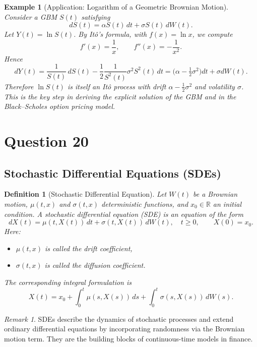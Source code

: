 \documentclass[12pt,a4paper]{book}
\newtheorem{definition}{Definition}[chapter]
\newtheorem{example}{Example}[chapter]
\theoremstyle{remark}
\newtheorem{remark}{Remark}[chapter]
\begin{document}
\begin{example}[Application: Logarithm of a Geometric Brownian Motion]
Consider a GBM $S(t)$ satisfying
\[
dS(t) = \alpha S(t)\,dt + \sigma S(t)\,dW(t).
\]
Let $Y(t) = \ln S(t)$. By Itô's formula, with $f(x) = \ln x$, we compute
\[
f'(x) = \frac{1}{x}, \qquad f''(x) = -\frac{1}{x^2}.
\]
Hence
\[
dY(t) = \frac{1}{S(t)}\,dS(t) - \frac{1}{2}\frac{1}{S^2(t)}\sigma^2 S^2(t)\,dt
= \Big(\alpha - \tfrac{1}{2}\sigma^2\Big)dt + \sigma dW(t).
\]
Therefore $\ln S(t)$ is itself an Itô process with drift $\alpha - \tfrac{1}{2}\sigma^2$ and volatility $\sigma$. This is the key step in deriving the explicit solution of the GBM and in the Black--Scholes option pricing model.
\end{example}










\newpage
\section{Question 20}
\subsection*{Stochastic Differential Equations (SDEs)}

\begin{definition}[Stochastic Differential Equation]
Let $W(t)$ be a Brownian motion, $\mu(t,x)$ and $\sigma(t,x)$ deterministic functions, and $x_0 \in \mathbb{R}$ an initial condition. 
A \emph{stochastic differential equation (SDE)} is an equation of the form
\[
dX(t) = \mu(t,X(t))\,dt + \sigma(t,X(t))\,dW(t), 
\quad t \geq 0, \qquad X(0) = x_0.
\]
Here:
\begin{itemize}
    \item $\mu(t,x)$ is called the \emph{drift coefficient},
    \item $\sigma(t,x)$ is called the \emph{diffusion coefficient}.
\end{itemize}
The corresponding \emph{integral formulation} is
\[
X(t) = x_0 + \int_0^t \mu(s,X(s))\,ds + \int_0^t \sigma(s,X(s))\,dW(s).
\]
\end{definition}

\begin{remark}
SDEs describe the dynamics of stochastic processes and extend ordinary differential equations by incorporating randomness via the Brownian motion term.
They are the building blocks of continuous-time models in finance.
\end{remark}
\end{document}

